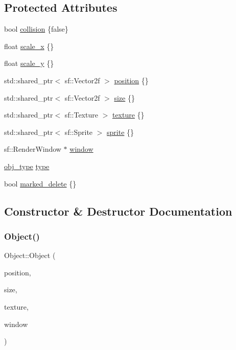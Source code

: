 \subsection*{Protected Attributes}
\begin{DoxyCompactItemize}
\item 
bool \hyperlink{classObject_a8bf085add0219866f58bbfc15ac48b9b}{collision} \{false\}
\item 
float \hyperlink{classObject_a3dc82bc3d0d5a67d8de2d2a556b20b17}{scale\+\_\+x} \{\}
\item 
float \hyperlink{classObject_a448bd055673146c85cc1d48bc52fca53}{scale\+\_\+y} \{\}
\item 
std\+::shared\+\_\+ptr$<$ sf\+::\+Vector2f $>$ \hyperlink{classObject_a8b1724482fb412feb64a638038161b7a}{position} \{\}
\item 
std\+::shared\+\_\+ptr$<$ sf\+::\+Vector2f $>$ \hyperlink{classObject_ac8bfde5d0428d9c091854fe1a09b7d9f}{size} \{\}
\item 
std\+::shared\+\_\+ptr$<$ sf\+::\+Texture $>$ \hyperlink{classObject_a8ff6491b841d0f48da3d98041fbca934}{texture} \{\}
\item 
std\+::shared\+\_\+ptr$<$ sf\+::\+Sprite $>$ \hyperlink{classObject_ab7f6122c2e79c159f9c8f002f1e5a36e}{sprite} \{\}
\item 
sf\+::\+Render\+Window $\ast$ \hyperlink{classObject_a5c6cfc086ea1e39e0b3cf8633a763bf8}{window}
\item 
\hyperlink{Object_8h_ac87c026b772bad1b7bb6edea6200fc92}{obj\+\_\+type} \hyperlink{classObject_adc16f3d60793624128eaccca16622aa5}{type}
\item 
bool \hyperlink{classObject_a1923371c414847b5cfe3f559aab371e8}{marked\+\_\+delete} \{\}
\end{DoxyCompactItemize}


\subsection{Constructor \& Destructor Documentation}
\mbox{\label{classObject_aa4f8406457e3a63439718536e4c9261e}} 
\subsubsection{\texorpdfstring{Object()}{Object()}}
{\footnotesize\ttfamily Object\+::\+Object (\begin{DoxyParamCaption}\item[{std\+::shared\+\_\+ptr$<$ sf\+::\+Vector2f $>$}]{position,  }\item[{std\+::shared\+\_\+ptr$<$ sf\+::\+Vector2f $>$}]{size,  }\item[{std\+::shared\+\_\+ptr$<$ sf\+::\+Texture $>$}]{texture,  }\item[{sf\+::\+Render\+Window $\ast$}]{window }\end{DoxyParamCaption})}

